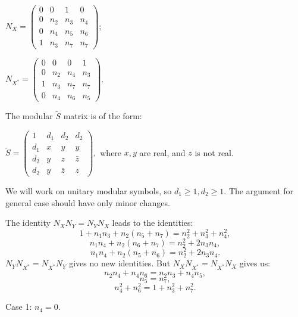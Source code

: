 \documentclass[12pt,psamsfonts]{amsart}
\newcommand{\tS}{\tilde{S}}
\numberwithin{equation}{section}
\theoremstyle{definition}
\begin{document}
$N_X=\begin{pmatrix}
   0&0& 1&0 \\
   0&n_2& n_3 &n_4\\
   0 &n_4&n_5&n_6\\
   1 &n_3&n_7&n_7
 \end{pmatrix}$;

 $N_{X^*}=\begin{pmatrix}
   0&0& 0&1 \\
   0&n_2& n_4 &n_3\\
   1 &n_3&n_7&n_7\\
   0 &n_4&n_6&n_5
 \end{pmatrix}$.


 The modular $\tS$ matrix is of the form:

$ \tS=\begin{pmatrix}
   1&d_1& d_2&d_2 \\
   d_1&x& y &y\\
   d_2& y& z&\bar{z}\\
   d_2 &y &\bar{z}& z
 \end{pmatrix},$ where $x,y$ are real, and $z$ is not real.

We will work on unitary modular symbols, so $d_1\geq 1, d_2\geq 1$.
The argument for general case should have only minor changes.

 The identity $N_XN_Y=N_YN_X$ leads to the identities:
 \begin{equation}
 1+n_1n_3+n_2(n_5+n_7)=n_2^2+n_3^2+n_4^2,
 \end{equation}
  \begin{equation}
 n_1n_4+n_2(n_6+n_7)=n_2^2+2n_3n_4,
 \end{equation} \begin{equation}
 n_1n_4+n_2(n_5+n_6)=n_2^2+2n_3n_4.
 \end{equation}
 $N_YN_{X^*}=N_{X^*}N_Y$ gives no new identities.  But
 $N_XN_{X^*}=N_{X^*}N_X$ gives us:
  \begin{equation}\label{n2n4dependence}
 n_2n_4+n_4n_6=n_2n_3+n_4n_5,
 \end{equation}
 \begin{equation}
 n_5=n_7,
 \end{equation} \begin{equation}
 n_4^2+n_6^2=1+n_3^2+n_7^2.
 \end{equation}

 Case 1: $n_4=0$.
\end{document}

